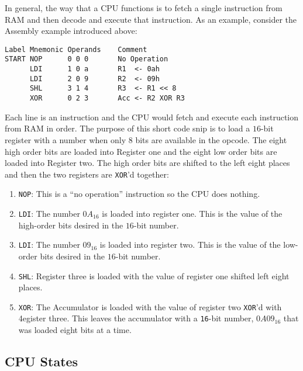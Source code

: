 In general, the way that a \ac{CPU} functions is to fetch a single instruction from \ac{RAM} and then decode and execute that instruction. As an example, consider the Assembly example introduced above:

\begin{Verbatim}[commandchars=~\[\], samepage=true, fontfamily=courier]
Label Mnemonic Operands    Comment
START NOP      0 0 0       No Operation
      LDI      1 0 a       R1  <- 0ah
      LDI      2 0 9       R2  <- 09h
      SHL      3 1 4       R3  <- R1 << 8
      XOR      0 2 3       Acc <- R2 XOR R3
\end{Verbatim}

Each line is an instruction and the \ac{CPU} would fetch and execute each instruction from \ac{RAM} in order. The purpose of this short code snip is to load a $ 16 $-bit register with a number when only $ 8 $ bits are available in the opcode. The eight high order bits are loaded into Register one and the eight low order bits are loaded into Register two. The high order bits are shifted to the left eight places and then the two registers are \lstinline[columns=fixed]|XOR|'d together:

\begin{enumerate}
  \item \lstinline[columns=fixed]|NOP|: This is a ``no operation'' instruction so the \ac{CPU} does nothing.
  \item \lstinline[columns=fixed]|LDI|: The number $ 0A_{16} $ is loaded into register one. This is the value of the high-order bits desired in the $ 16 $-bit number.
  \item \lstinline[columns=fixed]|LDI|: The number $ 09_{16} $ is loaded into register two.  This is the value of the low-order bits desired in the $ 16 $-bit number.
  \item \lstinline[columns=fixed]|SHL|: Register three is loaded with the value of register one shifted left eight places.
  \item \lstinline[columns=fixed]|XOR|: The Accumulator is loaded with the value of register two \lstinline[columns=fixed]|XOR|'d with 4egister three. This leaves the accumulator with a \lstinline[columns=fixed]|16|-bit number, $ 0A09_{16} $ that was loaded eight bits at a time.
\end{enumerate}

\subsection{CPU States}
\label{SIM:subsec:cpu_states}

